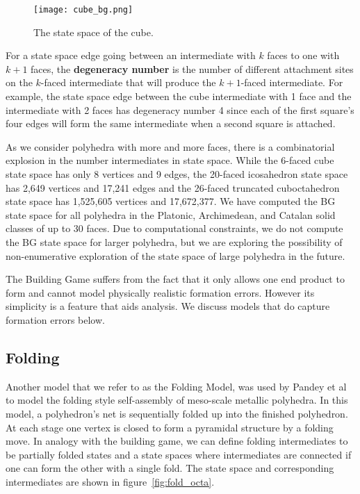 \documentclass[12pt]{article}
\begin{document}
\begin{figure}[h]
\centering
\texttt{[image: cube\_bg.png]}
\caption{The state space of the cube.}
\label{fig:cube_bg}
\end{figure}




For a state space edge going between an intermediate with $k$ faces to one with $k+1$ faces, the \textbf{degeneracy number} is the number of different attachment sites on the $k$-faced intermediate that will produce the $k+1$-faced intermediate. For example, the state space edge between the cube intermediate with 1 face and the intermediate with 2 faces has degeneracy number 4 since each of the first square's four edges will form the same intermediate when a second square is attached. 


As we consider polyhedra with more and more faces, there is a combinatorial explosion in the number intermediates in state space. While the 6-faced cube state space has only 8 vertices and 9 edges, the 20-faced icosahedron state space has 2,649 vertices and 17,241 edges and the 26-faced truncated cuboctahedron state space has 1,525,605 vertices and 17,672,377. We have computed the BG state space for all polyhedra in the Platonic, Archimedean, and Catalan solid classes of up to 30 faces. Due to computational constraints, we do not compute the BG state space for larger polyhedra, but we are exploring the possibility of non-enumerative exploration of the state space of large polyhedra in the future. 

The Building Game suffers from the fact that it only allows one end product to form and cannot model physically realistic formation errors. However its simplicity is a feature that aids analysis. We discuss models that do capture formation errors below.  


\subsection{Folding}
Another model that we refer to as the Folding Model, was used by Pandey et al to model the folding style self-assembly of meso-scale metallic polyhedra. In this model, a polyhedron's net is sequentially folded up into the finished polyhedron. At each stage one vertex is closed to form a pyramidal structure by a folding move. In analogy with the building game, we can define folding intermediates to be partially folded states and a state spaces where intermediates are connected if one can form the other with a single fold. The state space and corresponding intermediates are shown in figure~\ref{fig:fold_octa}. 
\end{document}
